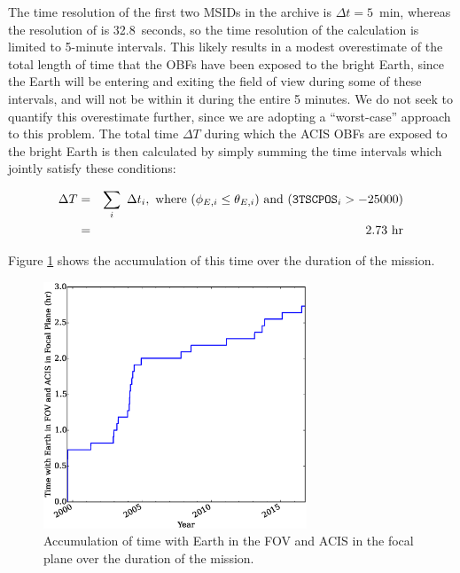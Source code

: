 \documentclass[11pt]{article}
\begin{document}
The time resolution of the first two MSIDs in the archive is $\Delta{t} = 5$~min, whereas the resolution
of  is 32.8~seconds, so the time resolution of the calculation is limited to 5-minute intervals.
This likely results in a modest overestimate of the total length of time that the OBFs have been exposed to
the bright Earth, since the Earth will be entering and exiting the field of view during some of these intervals,
and will not be within it during the entire 5 minutes. We do not seek to quantify this overestimate further, since we are adopting a ``worst-case'' approach to this problem. The total time $\Delta{T}$ during which the ACIS OBFs are exposed to the bright Earth is then calculated by simply summing the time intervals which jointly satisfy these conditions:

\begin{eqnarray}
\Delta{T} &=& \displaystyle\sum_i~\Delta{t_i},~{\rm where}~(\phi_{E,i} \leq \theta_{E,i})~{\rm and}~(\texttt{3TSCPOS}_i > -25000) \\
\nonumber &=& 2.73~{\rm hr}
\end{eqnarray}

\noindent
Figure \ref{fig:time_accum} shows the accumulation of this time over the duration of the mission.

\begin{figure}
\begin{center}
\includegraphics[width=0.7\textwidth]{time_accum.eps}
\caption{Accumulation of time with Earth in the FOV and ACIS in the focal plane over the duration of the mission.\label{fig:time_accum}}
\end{center}
\end{figure}
\end{document}
